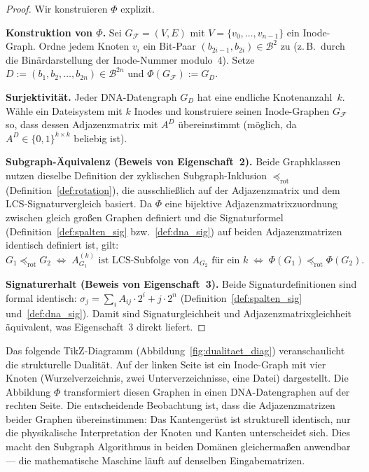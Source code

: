 ﻿\documentclass[a4paper,12pt]{article}
\theoremstyle{definition}
\theoremstyle{plain}
\begin{document}
\begin{proof}
  Wir konstruieren $\Phi$ explizit.
  
  \textbf{Konstruktion von $\Phi$.}
  Sei $G_\mathcal{F} = (V, E)$ mit $V = \{v_0, \ldots, v_{n-1}\}$
  ein Inode-Graph.  Ordne jedem Knoten $v_i$ ein Bit-Paar
  $(b_{2i-1}, b_{2i}) \in \mathcal{B}^2$ zu (z.\,B.\ durch die
  Binärdarstellung der Inode-Nummer modulo~4).
  Setze $D := (b_1, b_2, \ldots, b_{2n}) \in \mathcal{B}^{2n}$ und
  $\Phi(G_\mathcal{F}) := G_D$.
  
  \textbf{Surjektivität.}
  Jeder DNA-Datengraph $G_D$ hat eine endliche Knotenanzahl~$k$.
  Wähle ein Dateisystem mit $k$ Inodes und konstruiere seinen Inode-Graphen
  $G_\mathcal{F}$ so, dass dessen Adjazenzmatrix mit $A^D$ übereinstimmt
  (möglich, da $A^D \in \{0,1\}^{k \times k}$ beliebig ist).
  
  \textbf{Subgraph-Äquivalenz (Beweis von Eigenschaft~2).}
  Beide Graphklassen nutzen dieselbe Definition der zyklischen Subgraph-Inklusion
  $\preceq_{\mathrm{rot}}$ (Definition~\ref{def:rotation}), die ausschließlich
  auf der Adjazenzmatrix und dem LCS-Signaturvergleich basiert.
  Da $\Phi$ eine bijektive Adjazenzmatrixzuordnung zwischen gleich großen
  Graphen definiert und die Signaturformel (Definition~\ref{def:spalten_sig}
  bzw.~\ref{def:dna_sig}) auf beiden Adjazenzmatrizen identisch definiert ist,
  gilt:
  \[
    G_1 \preceq_{\mathrm{rot}} G_2
    \;\Longleftrightarrow\;
    A_{G_1}^{(k)} \text{ ist LCS-Subfolge von } A_{G_2}
    \text{ für ein } k
    \;\Longleftrightarrow\;
    \Phi(G_1) \preceq_{\mathrm{rot}} \Phi(G_2).
  \]
  
  \textbf{Signaturerhalt (Beweis von Eigenschaft~3).}
  Beide Signaturdefinitionen sind formal identisch:
  $\sigma_j = \sum_i A_{ij} \cdot 2^i + j \cdot 2^n$
  (Definition~\ref{def:spalten_sig} und~\ref{def:dna_sig}).
  Damit sind Signaturgleichheit und Adjazenzmatrixgleichheit äquivalent,
  was Eigenschaft~3 direkt liefert. 
\end{proof}

Das folgende TikZ-Diagramm (Abbildung~\ref{fig:dualitaet_diag}) veranschaulicht
die strukturelle Dualität.  Auf der linken Seite ist ein Inode-Graph mit
vier Knoten (Wurzelverzeichnis, zwei Unterverzeichnisse, eine Datei) dargestellt.
Die Abbildung $\Phi$ transformiert diesen Graphen in einen DNA-Datengraphen
auf der rechten Seite.  Die entscheidende Beobachtung ist, dass die
Adjazenzmatrizen beider Graphen übereinstimmen: Das Kantengerüst ist
strukturell identisch, nur die physikalische Interpretation der Knoten
und Kanten unterscheidet sich.  Dies macht den Subgraph Algorithmus in beiden
Domänen gleichermaßen anwendbar --- die mathematische Maschine läuft auf
denselben Eingabematrizen.
\end{document}
